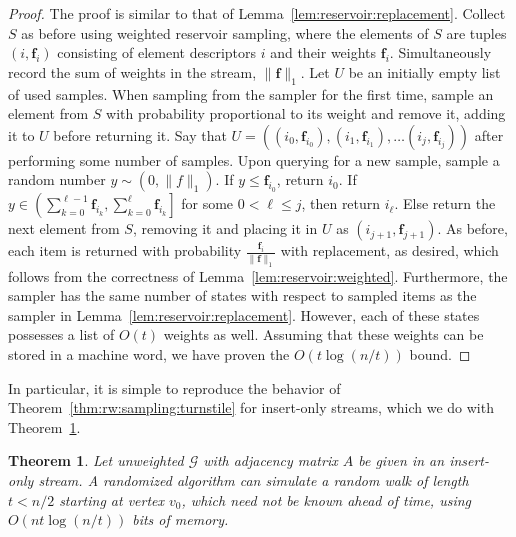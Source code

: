 \documentclass[10]{report}
\newtheorem{theorem}{Theorem}[section]
\begin{document}
%
\begin{proof}
The proof is similar to that of Lemma~\ref{lem:reservoir:replacement}.
Collect $S$ as before using weighted reservoir sampling, where the elements of $S$ are tuples $(i,\mathbf{f}_i)$ consisting of element descriptors $i$ and their weights $\mathbf{f}_i$.
Simultaneously record the sum of weights in the stream, $\|\mathbf{f}\|_1$.
Let $U$ be an initially empty list of used samples. 
When sampling from the sampler for the first time, sample an element from $S$ with probability proportional to its weight and remove it, adding it to $U$ before returning it.
Say that $U = ((i_0, \mathbf{f}_{i_0}), (i_1, \mathbf{f}_{i_1}), \dots (i_j, \mathbf{f}_{i_j}))$ after performing some number of samples.
Upon querying for a new sample, sample a random number $y \sim (0, \|f\|_1)$.
If $y \leq \mathbf{f}_{i_0}$, return $i_0$.
If $y \in \left ( \sum_{k=0}^{\ell-1}\mathbf{f}_{i_{k}}, \sum_{k=0}^{\ell}\mathbf{f}_{i_{k}} \right ]$ for some $0 < \ell \leq j$, then return $i_\ell$.
Else return the next element from $S$, removing it and placing it in $U$ as $(i_{j+1}, \mathbf{f}_{j+1})$.
As before, each item is returned with probability $\frac{\mathbf{f}_i}{\|\mathbf{f}\|_1}$ with replacement, as desired, which follows from the correctness of Lemma~\ref{lem:reservoir:weighted}.
Furthermore, the sampler has the same number of states with respect to sampled items as the sampler in Lemma~\ref{lem:reservoir:replacement}.
However, each of these states possesses a list of $O(t)$ weights as well.
Assuming that these weights can be stored in a machine word, we have proven the $O(t\log(n/t))$ bound.
\end{proof}
%

In particular, it is simple to reproduce the behavior of Theorem~\ref{thm:rw:sampling:turnstile} for insert-only streams, which we do with Theorem~\ref{thm:rw:sampling:insert-only}.
%
\begin{theorem} \label{thm:rw:sampling:insert-only}
Let unweighted $\mathcal{G}$ with adjacency matrix $A$ be given in an insert-only stream.
A randomized algorithm can simulate a random walk of length $t < n/2$ starting at vertex $v_0$, which need not be known ahead of time, using $O(nt \log (n/t))$ bits of memory.
\end{theorem}
\end{document}
